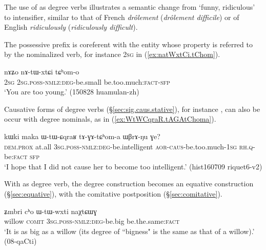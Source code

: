 The use of  as degree verbs illustrates a semantic change from `funny, ridiculous' to intensifier, similar to that of French \textit{drôlement} (\textit{drôlement difficile}) or of English \textit{ridiculously} (\textit{ridiculously difficult}).

The possessive prefix is coreferent with the entity whose property is referred to by the nominalized verb, for instance \textsc{2sg} in (\ref{ex:natWxtCi.tChom}). 

\begin{exe}
\ex \label{ex:natWxtCi.tChom}
\gll nɤʑo nɤ-tɯ-xtɕi tɕʰom-o \\
\textsc{2sg} \textsc{2sg}.\textsc{poss}-\textsc{nmlz}:\textsc{deg}-be.small be.too.much:\textsc{fact}-\textsc{sfp} \\
\glt `You are too young.' (150828 huamulan-zh)
\end{exe}

Causative forms of degree verbs (§\ref{sec:sig.caus.stative}), for instance , can also be occur with degree nominals, as in (\ref{ex:WtWCqraR.tAGAtChoma}).

\begin{exe}
\ex \label{ex:WtWCqraR.tAGAtChoma}
\gll kɯki maka ɯ-tɯ-ɕqraʁ tɤ-ɣɤ-tɕʰom-a ɯβrɤ-ŋu ɣe? \\
\textsc{dem}.\textsc{prox} at.all  \textsc{3sg}.\textsc{poss}-\textsc{nmlz}:\textsc{deg}-be.intelligent \textsc{aor}-\textsc{caus}-be.too.much-\textsc{1sg} \textsc{rh}.\textsc{q}-be:\textsc{fact} \textsc{sfp} \\
\glt `I hope that I did not cause her to become too intelligent.' (hist160709 riquet6-v2)
\end{exe}

With  as degree verb, the degree construction becomes an equative construction (§\ref{sec:equative}), with the comitative postposition  (§\ref{sec:comitative}). 

\begin{exe}
\ex \label{ex:WtWwxti.naXtCWG}
\gll ʑmbri cʰo ɯ-tɯ-wxti naχtɕɯɣ \\
willow \textsc{comit} \textsc{3sg}.\textsc{poss}-\textsc{nmlz}:\textsc{deg}-be.big be.the.same:\textsc{fact} \\
\glt `It is as big as a willow (its degree of ``bigness" is the same as that of a willow).' (08-qaCti)
\end{exe}

